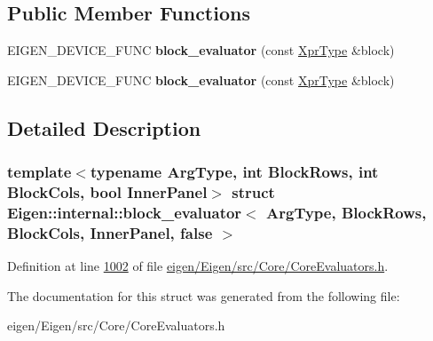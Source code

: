 \subsection*{Public Member Functions}
\begin{DoxyCompactItemize}
\item 
\mbox{\label{struct_eigen_1_1internal_1_1block__evaluator_3_01_arg_type_00_01_block_rows_00_01_block_cols_00_01_inner_panel_00_01false_01_4_a60d48f1e854540b4482f08a2df683f01}} 
E\+I\+G\+E\+N\+\_\+\+D\+E\+V\+I\+C\+E\+\_\+\+F\+U\+NC {\bfseries block\+\_\+evaluator} (const \hyperlink{group___core___module_class_eigen_1_1_block}{Xpr\+Type} \&block)
\item 
\mbox{\label{struct_eigen_1_1internal_1_1block__evaluator_3_01_arg_type_00_01_block_rows_00_01_block_cols_00_01_inner_panel_00_01false_01_4_a60d48f1e854540b4482f08a2df683f01}} 
E\+I\+G\+E\+N\+\_\+\+D\+E\+V\+I\+C\+E\+\_\+\+F\+U\+NC {\bfseries block\+\_\+evaluator} (const \hyperlink{group___core___module_class_eigen_1_1_block}{Xpr\+Type} \&block)
\end{DoxyCompactItemize}


\subsection{Detailed Description}
\subsubsection*{template$<$typename Arg\+Type, int Block\+Rows, int Block\+Cols, bool Inner\+Panel$>$\newline
struct Eigen\+::internal\+::block\+\_\+evaluator$<$ Arg\+Type, Block\+Rows, Block\+Cols, Inner\+Panel, false $>$}



Definition at line \hyperlink{eigen_2_eigen_2src_2_core_2_core_evaluators_8h_source_l01002}{1002} of file \hyperlink{eigen_2_eigen_2src_2_core_2_core_evaluators_8h_source}{eigen/\+Eigen/src/\+Core/\+Core\+Evaluators.\+h}.



The documentation for this struct was generated from the following file\+:\begin{DoxyCompactItemize}
\item 
eigen/\+Eigen/src/\+Core/\+Core\+Evaluators.\+h\end{DoxyCompactItemize}
